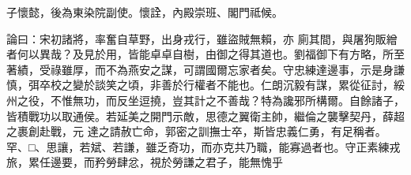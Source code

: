 \begin{pinyinscope}
 子懷懿，後為東染院副使。懷詮，內殿崇班、閣門祗候。



 論曰：宋初諸將，率奮自草野，出身戎行，雖盜賊無賴，亦
 廁其間，與屠狗販繒者何以異哉？及見於用，皆能卓卓自樹，由御之得其道也。劉福御下有方略，所至著績，受祿雖厚，而不為燕安之謀，可謂國爾忘家者矣。守忠練達邊事，示是身謙慎，弭卒校之變於談笑之頃，非善於行權者不能也。仁朗沉毅有謀，累從征討，綏州之役，不惟無功，而反坐逗撓，豈其計之不善哉？特為讒邪所構爾。自餘諸子，皆積戰功以取通侯。若延美之開門示敵，思德之翼衛主帥，繼倫之襲擊契丹，薛超之裹創赴戰，元
 達之請赦亡命，郭密之訓撫士卒，斯皆忠義仁勇，有足稱者。罕、□、思讓，若斌、若謙，雖乏奇功，而亦克共乃職，能寡過者也。守正素練戎旅，累任邊要，而矜勞肆忿，視於勞謙之君子，能無愧乎



\end{pinyinscope}
